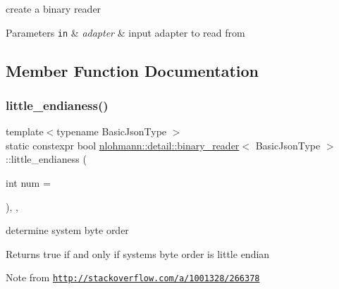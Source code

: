 create a binary reader 


\begin{DoxyParams}[1]{Parameters}
\mbox{\tt in}  & {\em adapter} & input adapter to read from \\
\hline
\end{DoxyParams}


\subsection{Member Function Documentation}
\mbox{\label{classnlohmann_1_1detail_1_1binary__reader_a1d8f70f95d241354f86a0b9ae711c1c3}} 
\subsubsection{\texorpdfstring{little\+\_\+endianess()}{little\_endianess()}}
{\footnotesize\ttfamily template$<$typename Basic\+Json\+Type $>$ \\
static constexpr bool \mbox{\hyperlink{classnlohmann_1_1detail_1_1binary__reader}{nlohmann\+::detail\+::binary\+\_\+reader}}$<$ Basic\+Json\+Type $>$\+::little\+\_\+endianess (\begin{DoxyParamCaption}\item[{int}]{num = {} }\end{DoxyParamCaption})\hspace{0.3cm}{\ttfamily [inline]}, {\ttfamily [static]}, {\ttfamily [noexcept]}}



determine system byte order 

\begin{DoxyReturn}{Returns}
true if and only if system\textquotesingle{}s byte order is little endian
\end{DoxyReturn}
\begin{DoxyNote}{Note}
from \href{http://stackoverflow.com/a/1001328/266378}{\tt http\+://stackoverflow.\+com/a/1001328/266378} 
\end{DoxyNote}
\mbox{\label{classnlohmann_1_1detail_1_1binary__reader_a04bcdc8f55b26fafa9775a2f89e48fc2}} 

